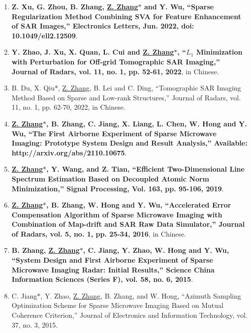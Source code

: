 \documentclass[paper=a4,fontsize=11pt]{scrartcl}
\begin{document}
\begin{enumerate}
\item \textbf{Z. Xu, G. Zhou, B. Zhang, \underline{Z. Zhang$\ast$} and Y. Wu, ``Sparse Regularization Method Combining SVA for Feature Enhancement of SAR Images,'' Electronics Letters, Jun. 2022, doi: 10.1049/ell2.12509}.

\item \textbf{Y. Zhao, J. Xu, X. Quan, L. Cui and \underline{Z. Zhang$\ast$}, ``$L_1$ Minimization with Perturbation for Off-grid Tomographic SAR Imaging,'' Journal of Radars, vol. 11, no. 1, pp. 52-61, 2022}, in Chinese.

\item B. Du, X. Qiu$\ast$, \underline{Z. Zhang}, B. Lei and C. Ding, ``Tomographic SAR Imaging Method Based on Sparse and Low-rank Structures,'' Journal of Radars, vol. 11, no. 1, pp. 62-70, 2022, in Chinese.


\item \textbf{\underline{Z. Zhang$\ast$}, B. Zhang, C. Jiang, X. Liang, L. Chen, W. Hong and Y. Wu, ``The First Airborne Experiment of Sparse Microwave Imaging: Prototype System Design and Result Analysis,'' Available: http://arxiv.org/abs/2110.10675}.

\item \textbf{\underline{Z. Zhang$\ast$}, Y. Wang, and Z. Tian, ``Efficient Two-Dimensional Line Spectrum Estimation Based on Decoupled Atomic Norm Minimization,'' Signal Processing, Vol. 163, pp. 95-106, 2019}.



\item \textbf{\underline{Z. Zhang$\ast$}, B. Zhang, W. Hong and Y. Wu, ``Accelerated Error Compensation Algorithm of Sparse Microwave Imaging with Combination of Map-drift and SAR Raw Data Simulator,'' Journal of Radars, vol. 5, no. 1, pp. 25-34, 2016}, in Chinese.

\item \textbf{B. Zhang, \underline{Z. Zhang$\ast$}, C. Jiang, Y. Zhao, W. Hong and Y. Wu, ``System Design and First Airborne Experiment of Sparse Microwave Imaging Radar: Initial Results,'' Science China Information Sciences (Series F), vol. 58, no. 6, 2015}.

\item C. Jiang$\ast$, Y. Zhao, \underline{Z. Zhang}, B. Zhang, and W. Hong, ``Azimuth Sampling Optimization Scheme for Sparse Microwave Imaging Based on Mutual Coherence Criterion,'' Journal of Electronics and Information Technology, vol. 37, no. 3, 2015.


\end{enumerate}
\end{document}
